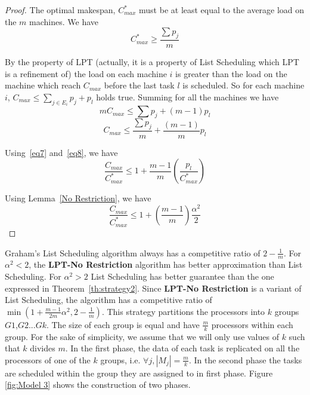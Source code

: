 \begin{proof}
  The optimal makespan, $C_{max}^{*}$ must be at least equal to the
  average load on the $m$ machines. We have
  \begin{equation}\label{eq7}
    C_{max}^{*}\geq\frac{\sum p_j}{m}
  \end{equation}

  By the property of LPT (actually, it is a property of List
  Scheduling which LPT is a refinement of) the load on each machine
  $i$ is greater than the load on the machine which reach $C_{max}$
  before the last task $l$ is scheduled. So for each machine $i$,
  $C_{max} \leq \sum_{j \in E_i}^{}{p_j} + p_l$ holds true.  Summing
  for all the machines we have
  \begin{equation}\nonumber
    mC_{max} \leq  \sum {p_j} + (m-1)p_l
  \end{equation}
  \begin{equation}\label{eq8}
    C_{max} \leq  \frac{\sum {p_j}}{m} + \frac{(m-1)}{m}p_l
  \end{equation}
  
  Using~\ref{eq7} and~\ref{eq8}, we have
  \begin{equation}\nonumber
    \frac{C_{max}}{C_{max}^{*}} \leq 1 + {\frac{m-1}{m}}\left(\frac{p_l}{C_{max}^{*}}\right)
  \end{equation}
  
  Using Lemma~\ref{No Restriction}, we have 
  \begin{equation}\nonumber
    \frac{C_{max}}{C_{max}^{*}} \leq 1 + \left(\frac{m-1}{m}\right)\frac{\alpha^{2}}{2}
  \end{equation}

\end{proof}  

Graham's List Scheduling algorithm always has a competitive ratio
of $2-\frac{1}{m}$. For $\alpha^2 < 2$, the \textbf{LPT-No
  Restriction} algorithm has better approximation than List
Scheduling. For $\alpha^2 > 2$ List Scheduling has better guarantee
than the one expressed in Theorem~\ref{th:strategy2}. Since
\textbf{LPT-No Restriction} is a variant of List Scheduling,
the algorithm has a competitive ratio of $\min (1 +
\frac{m-1}{2m}\alpha^{2}, 2-\frac{1}{m})$.
This strategy partitions the processors into $k$ groups
 $G1$,$G2$...$Gk$. The size of each group is equal and have
 $\frac{m}{k}$ processors within each group. For the sake of
 simplicity, we assume that we will only use values of $k$ such that
 $k$ divides $m$. In the first phase, the data of each task is
 replicated on all the processors of one of the $k$ groups,
 i.e. $\forall j, |M_j|= \frac{m}{k}$. In the second phase the tasks
 are scheduled within the group they are assigned to in first phase.
 Figure \ref{fig:Model 3} shows the construction of two phases.
 

